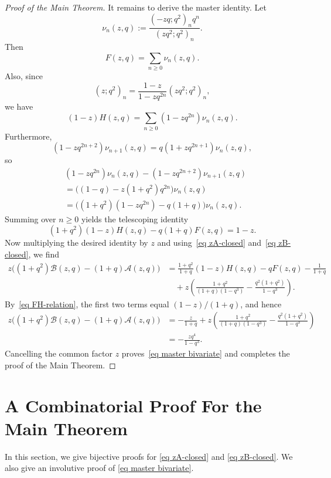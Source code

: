 \documentclass[reqno]{amsart}
\theoremstyle{definition}
\theoremstyle{plain}
\theoremstyle{remark}
\numberwithin{equation}{section}
\begin{document}
\begin{proof}[Proof of the Main Theorem]
It remains to derive the master identity. Let
\[
\nu_n(z,q):=\frac{(-zq;q^2)_n q^n}{(zq^2;q^2)_n}.
\]
Then
\[
F(z,q)=\sum_{n\ge 0}\nu_n(z,q).
\]
Also, since
\[
(z;q^2)_n=\frac{1-z}{1-zq^{2n}}(zq^2;q^2)_n,
\]
we have
\[
(1-z)H(z,q)=\sum_{n\ge 0}(1-zq^{2n})\nu_n(z,q).
\]
Furthermore,
\[
(1-zq^{2n+2})\nu_{n+1}(z,q)=q(1+zq^{2n+1})\nu_n(z,q),
\]
so
\begin{align*}
&(1-zq^{2n})\nu_n(z,q)-(1-zq^{2n+2})\nu_{n+1}(z,q)\\
&=\big((1-q)-z(1+q^2)q^{2n}\big)\nu_n(z,q)\\
&=\big((1+q^2)(1-zq^{2n})-q(1+q)\big)\nu_n(z,q).
\end{align*}
Summing over $n\ge 0$ yields the telescoping identity
\begin{equation}\label{eq FH-relation}
(1+q^2)(1-z)H(z,q)-q(1+q)F(z,q)=1-z.
\end{equation}
Now multiplying the desired identity by $z$ and using~\eqref{eq zA-closed} and~\eqref{eq zB-closed}, we find
\begin{align*}
z\big((1+q^2)\mathcal B(z,q)-(1+q)\mathcal A(z,q)\big)
&=\frac{1+q^2}{1+q}(1-z)H(z,q)-qF(z,q)-\frac{1}{1+q} \\
&\quad +z\left(\frac{1+q^2}{(1+q)(1-q^3)}-\frac{q^2(1+q^2)}{1-q^3}\right).
\end{align*}
By~\eqref{eq FH-relation}, the first two terms equal $(1-z)/(1+q)$, and hence
\begin{align*}
z\big((1+q^2)\mathcal B(z,q)-(1+q)\mathcal A(z,q)\big)
&=-\frac{z}{1+q}+z\left(\frac{1+q^2}{(1+q)(1-q^3)}-\frac{q^2(1+q^2)}{1-q^3}\right)\\
&=-\frac{zq^4}{1-q^3}.
\end{align*}
Cancelling the common factor $z$ proves~\eqref{eq master bivariate} and completes the proof of the Main Theorem.
\end{proof}

\section{A Combinatorial Proof For the Main Theorem}\label{combinatorialproofs}

In this section, we give bijective proofs for \eqref{eq zA-closed} and \eqref{eq zB-closed}. We also give an involutive proof of \eqref{eq master bivariate}. 
\end{document}
